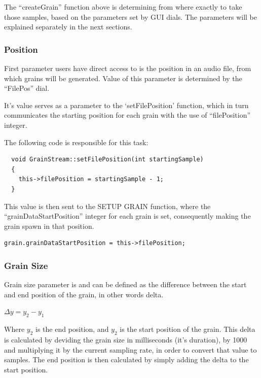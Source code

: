 The ``createGrain'' function above is determining from where exactly
to take those samples, based on the parameters set by GUI dials. The
parameters will be explained separately in the next sections.

\subsubsection{Position}

First parameter users have direct access to is the position in an
audio file, from which grains will be generated. Value of this
parameter is determined by the ``FilePos'' dial.

It's value serves as a parameter to the `setFilePosition' function, which
in turn communicates the starting position for each grain with the
use of ``filePosition'' integer.


The following code is responsible for
this task:
\begin{lstlisting}
  void GrainStream::setFilePosition(int startingSample)
  {
    this->filePosition = startingSample - 1;
  }
\end{lstlisting}

This value is then sent to the SETUP GRAIN function, where the
``grainDataStartPosition'' integer for each grain is set, consequently
making the grain spawn in that position.
\begin{lstlisting}
grain.grainDataStartPosition = this->filePosition;
\end{lstlisting}

\subsubsection{Grain Size}

Grain size parameter is and can be defined as the difference between
the start and end position of the grain, in other words delta.

$\Delta y = y_2 - y_1$

Where $y_2$ is the end position, and $y_2$ is the start position of
the grain. This delta is calculated by deviding the grain size in
milliseconds (it's duration), by 1000 and multiplying it by the
current sampling rate, in order to convert that value to samples. The
end position is then calculated by simply adding the delta to the
start position.

